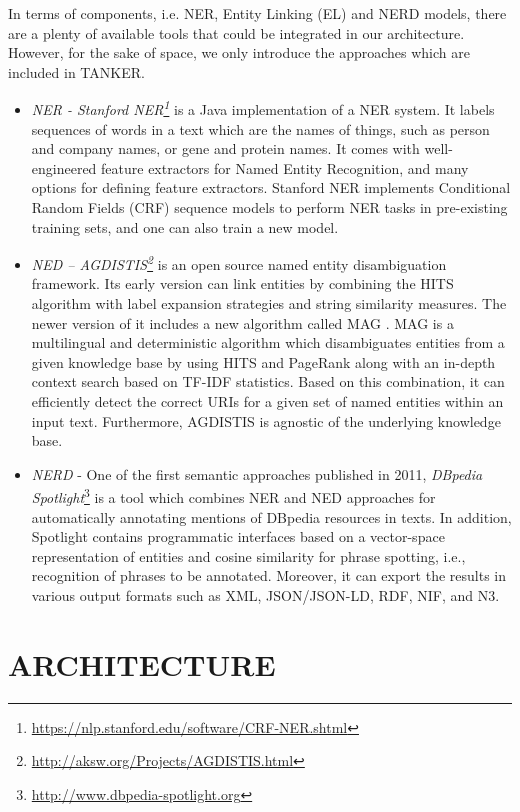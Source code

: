 \documentclass{sig-alternate}
\begin{document}
In terms of components, i.e. NER, Entity Linking (EL) and NERD models, there are a plenty of available tools that could be integrated in our architecture. However, for the sake of space, we only introduce the approaches which are included in TANKER.
\begin{itemize}
\item {\em NER - Stanford NER}{\em \footnote{\url{https://nlp.stanford.edu/software/CRF-NER.shtml}}}{\em } \cite{_Ref490760481}is a Java implementation of a NER system. It labels sequences of words in a text which are the names of things, such as person and company names, or gene and protein names. It comes with well-engineered feature extractors for Named Entity Recognition, and many options for defining feature extractors. Stanford NER implements Conditional Random Fields (CRF) sequence models to perform NER tasks in pre-existing training sets, and one can also train a new model.
\item {\em NED -- AGDISTIS}{\em \footnote{\url{http://aksw.org/Projects/AGDISTIS.html}}}{\em } \cite{_Ref490760498}is an open source named entity disambiguation framework. Its early version can link entities by combining the HITS algorithm with label expansion strategies and string similarity measures. The newer version of it includes a new algorithm called MAG \cite{_Ref490760509}. MAG is a multilingual and deterministic algorithm which disambiguates entities from a given knowledge base by using HITS and PageRank along with an in-depth context search based on TF-IDF statistics. Based on this combination, it can efficiently detect the correct URIs for a given set of named entities within an input text. Furthermore, AGDISTIS is agnostic of the underlying knowledge base.
\item {\em NERD} - One of the first semantic approaches published in 2011, {\em DBpedia Spotlight}\footnote{\url{http://www.dbpedia-spotlight.org}} \cite{_Ref490759726} is a tool which combines NER and NED approaches for automatically annotating mentions of DBpedia resources \cite{_Ref490760525} in texts. In addition, Spotlight contains programmatic interfaces based on a vector-space representation of entities and cosine similarity for phrase spotting, i.e., recognition of phrases to be annotated. Moreover, it can export the results in various output formats such as XML, JSON/JSON-LD, RDF, NIF, and N3.
\end{itemize}

\section{ARCHITECTURE}\label{_Ref490760383}
\end{document}
